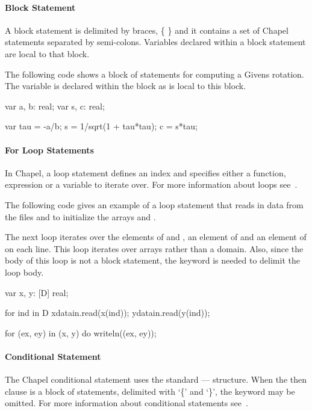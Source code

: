 \paragraph{Block Statement}  
A block statement is delimited by braces, \{ \} and it
contains a set of Chapel statements separated by semi-colons.  
Variables declared within a block statement are local to that block.

\begin{example}
The following code shows a block of statements for computing a Givens
rotation.  The variable  is declared within the block as is
local to this block.
\begin{chapel}

var a, b: real;
var s, c: real;

{
  var tau = -a/b;
  s = 1/sqrt(1 + tau*tau);
  c = s*tau;
}

\end{chapel} 
\end{example} 

\paragraph{For Loop Statements} 
In Chapel, a  loop statement defines an index and
specifies either a function, expression or a variable to
iterate over.  For more information about  loops
see~.

\begin{example}
The following code gives an example of a  loop
statement that reads in data from the files 
and  to initialize the arrays  and
.  

The next  loop iterates over the elements of 
 and , an element of  and an element
of  on each line.  This loop iterates over arrays rather
than a domain.  Also, since the body of this loop is not a block
statement, the keyword  is needed to delimit the loop
body. 
\begin{chapel}
var x, y: [D] real;

for ind in D { 
  xdatain.read(x(ind));
  ydatain.read(y(ind));
}

for (ex, ey) in (x, y) do 
  writeln((ex, ey));
\end{chapel}
\end{example}

\paragraph{Conditional Statement} 
The Chapel conditional statement uses the standard
---- structure.  When
the then clause is a block of statements, delimited with
`\{' and `\}', the  keyword may be omitted.
For more information about conditional statements 
see~.

